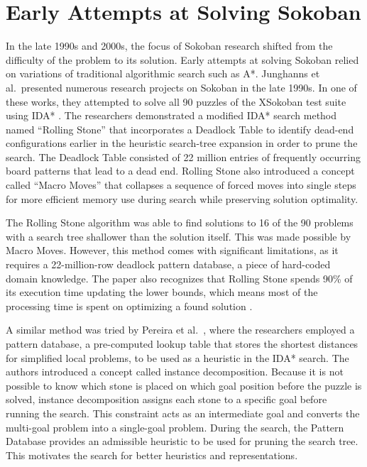 
\section{Early Attempts at Solving Sokoban}

In the late 1990s and 2000s, the focus of Sokoban research shifted from the difficulty of the problem to its solution. Early attempts at solving Sokoban relied on variations of traditional algorithmic search such as A*. Junghanns et al.\ presented numerous research projects on Sokoban in the late 1990s. In one of these works, they attempted to solve all 90 puzzles of the XSokoban test suite using IDA* \cite{myers_xsokoban, junghanns1997sokoban, junghanns1998sokoban}. The researchers demonstrated a modified IDA* search method named ``Rolling Stone'' that incorporates a Deadlock Table to identify dead-end configurations earlier in the heuristic search-tree expansion in order to prune the search. The Deadlock Table consisted of 22 million entries of frequently occurring board patterns that lead to a dead end. Rolling Stone also introduced a concept called ``Macro Moves'' that collapses a sequence of forced moves into single steps for more efficient memory use during search while preserving solution optimality.

The Rolling Stone algorithm was able to find solutions to 16 of the 90 problems with a search tree shallower than the solution itself. This was made possible by Macro Moves. However, this method comes with significant limitations, as it requires a 22-million-row deadlock pattern database, a piece of hard-coded domain knowledge. The paper also recognizes that Rolling Stone spends 90\% of its execution time updating the lower bounds, which means most of the processing time is spent on optimizing a found solution \cite{junghanns1998sokoban}.

A similar method was tried by Pereira et al.\ \cite{pereira2013finding}, where the researchers employed a pattern database, a pre-computed lookup table that stores the shortest distances for simplified local problems, to be used as a heuristic in the IDA* search. The authors introduced a concept called instance decomposition. Because it is not possible to know which stone is placed on which goal position before the puzzle is solved, instance decomposition assigns each stone to a specific goal before running the search. This constraint acts as an intermediate goal and converts the multi-goal problem into a single-goal problem. During the search, the Pattern Database provides an admissible heuristic to be used for pruning the search tree. This motivates the search for better heuristics and representations.